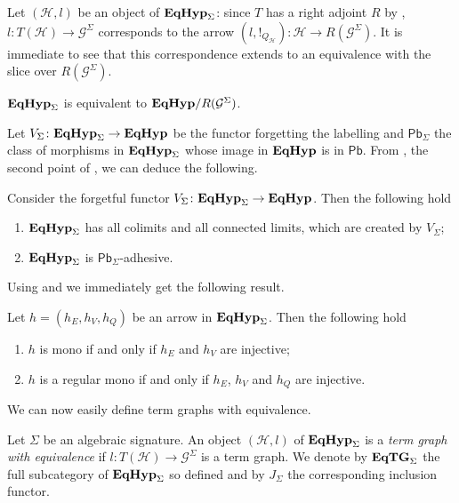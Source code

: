 \documentclass[3p]{elsarticle}
\newcommand{\pbc}{\mathsf{Pb}}
\newcommand{\catname}[1]{\textbf{\textup{#1}}}
\newcommand{\EqHyp}{\catname{EqHyp}} %
\newcommand{\EqTG}{\catname{EqTG}}
\theoremstyle{remark}
\theoremstyle{definition}
\begin{document}
Let $(\mathcal{H}, l)$ be an object of $\EqHyp_\Sigma$: since $T$ has a right adjoint $R$ by , $l\colon T(\mathcal{H})\to \mathcal{G}^\Sigma$ corresponds to the arrow $(l, !_{Q_{\mathcal{H}}})\colon \mathcal{H}\to R(\mathcal{G}^\Sigma)$. It is immediate to see that this correspondence extends to an equivalence with the slice over $R(\mathcal{G}^\Sigma)$.

\begin{prop}\label{prop:slice}
$\EqHyp_\Sigma$ is equivalent to $\EqHyp/R(\mathcal{G}^\Sigma)$.
\end{prop}

Let $V_\Sigma\colon \EqHyp_\Sigma\to \EqHyp$ be the functor forgetting the labelling and $\pbc_\Sigma$ the class of morphisms in $\EqHyp_\Sigma$ whose image in $\EqHyp$ is in $\pbc$. From , the second point of , we can deduce the following.

\begin{prop}\label{prop:lim}Consider the forgetful functor $V_{\Sigma}\colon \EqHyp_\Sigma\to \EqHyp$. Then the following hold
	\begin{enumerate}
		\item $\EqHyp_\Sigma$ has all colimits and all connected limits, which are created by $V_{\Sigma}$;
		\item $\EqHyp_\Sigma$ is $\pbc_\Sigma$-adhesive.
	\end{enumerate}
\end{prop}

Using  and  we immediately get the following result. 

\begin{cor}\label{prop:monos_in_eqhyps} Let $h=(h_{E}, h_V, h_Q)$ be an arrow in $\EqHyp_\Sigma$. Then the following hold
	\begin{enumerate}
		\item $h$ is mono if and only if $h_E$ and $h_V$ are injective;
		\item $h$ is a regular mono if and only if $h_E$, $h_V$ and $h_Q$ are injective.
	\end{enumerate}
\end{cor}


We can now easily define term graphs with equivalence.

\begin{defi}Let $\Sigma$ be an algebraic signature.
	An object $(\mathcal{H}, l)$ of $\EqHyp_\Sigma$ is a \emph{term graph with equivalence} if $l\colon T(\mathcal{H})\to \mathcal{G}^\Sigma$ is a term graph. We denote by $\EqTG_{\Sigma}$ the full subcategory of $\EqHyp_\Sigma$ so defined and by $J_{\Sigma}$ the corresponding inclusion functor.
 \end{defi}
\end{document}
